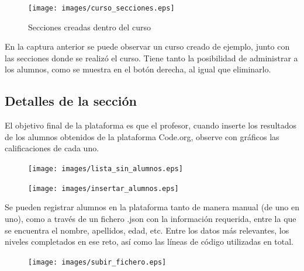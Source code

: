\begin{figure}[!th]
\begin{center}
\texttt{[image: images/curso\_secciones.eps]}
\caption{Secciones creadas dentro del curso}
\label{fig:17}
\end{center}
\end{figure}

En la captura anterior se puede observar un curso creado de ejemplo, junto con las secciones donde se realizó el curso. Tiene tanto la posibilidad de administrar a los alumnos, como se muestra en el botón derecha, al igual que eliminarlo.


\newpage
\subsection{Detalles de la sección}
\label{1:sec:6}

El objetivo final de la plataforma es que el profesor, cuando inserte los resultados de los alumnos obtenidos de la plataforma Code.org, observe con gráficos las calificaciones de cada uno.

\begin{figure}[!th]
\begin{center}
\texttt{[image: images/lista\_sin\_alumnos.eps]}
\label{fig:18}
\end{center}
\end{figure}

\begin{figure}[!th]
\begin{center}
\texttt{[image: images/insertar\_alumnos.eps]}
\label{fig:19}
\end{center}
\end{figure}

Se pueden registrar alumnos en la plataforma tanto de manera manual (de uno en uno), como a través de un fichero .json con la información requerida, entre la que se encuentra el nombre, apellidos, edad, etc. Entre los datos más relevantes,
los niveles completados en ese reto, así como las líneas de código utilizadas en total.

\begin{figure}[!th]
\begin{center}
\texttt{[image: images/subir\_fichero.eps]}
\label{fig:20}
\end{center}
\end{figure}

